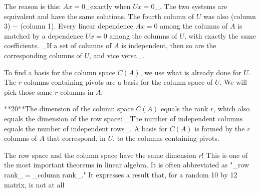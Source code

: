 The reason is this: \(Ax=0\)_exactly when \(Ux=0\)_. The two systems are equivalent and have the same solutions. The fourth column of \(U\) was also (column 3) \(-\) (column 1). Every linear dependence \(Ax=0\) among the columns of \(A\) is matched by a dependence \(Ux=0\) among the columns of \(U\), with exactly the same coefficients. _If a set of columns of \(A\) is independent, then so are the corresponding columns of \(U\), and vice versa_.

To find a basis for the column space \(C(A)\), we use what is already done for \(U\). The \(r\) columns containing pivots are a basis for the column space of \(U\). We will pick those same \(r\) columns in \(A\):

**20**The dimension of the column space \(C(A)\) equals the rank \(r\), which also equals the dimension of the row space: _The number of independent columns equals the number of independent rows_. A basis for \(C(A)\) is formed by the \(r\) columns of \(A\) that correspond, in \(U\), to the columns containing pivots.

The row space and the column space have the same dimension \(r\)! This is one of the most important theorems in linear algebra. It is often abbreviated as "_row rank_\(=\)_column rank_." It expresses a result that, for a random 10 by 12 matrix, is not at all 